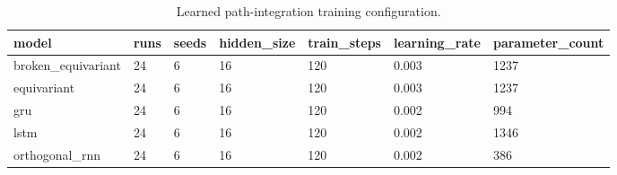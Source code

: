 \begin{table}[t]
\centering
\small
\caption{Learned path-integration training configuration.}
\label{tab:training-config}
\begin{tabular}{lllllll}
\toprule
model & runs & seeds & hidden_size & train_steps & learning_rate & parameter_count \\
\midrule
broken\_equivariant & 24 & 6 & 16 & 120 & 0.003 & 1237 \\
equivariant & 24 & 6 & 16 & 120 & 0.003 & 1237 \\
gru & 24 & 6 & 16 & 120 & 0.002 & 994 \\
lstm & 24 & 6 & 16 & 120 & 0.002 & 1346 \\
orthogonal\_rnn & 24 & 6 & 16 & 120 & 0.002 & 386 \\
\bottomrule
\end{tabular}
\end{table}
